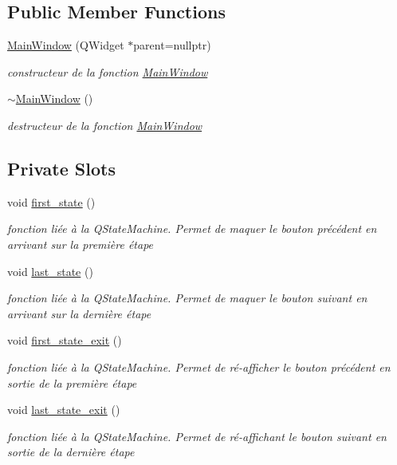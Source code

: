 \subsection*{Public Member Functions}
\begin{DoxyCompactItemize}
\item 
\hyperlink{classMainWindow_a996c5a2b6f77944776856f08ec30858d}{Main\+Window} (Q\+Widget $\ast$parent=nullptr)
\begin{DoxyCompactList}\small\item\em constructeur de la fonction \hyperlink{classMainWindow}{Main\+Window} \end{DoxyCompactList}\item 
\hyperlink{classMainWindow_ae98d00a93bc118200eeef9f9bba1dba7}{$\sim$\+Main\+Window} ()
\begin{DoxyCompactList}\small\item\em destructeur de la fonction \hyperlink{classMainWindow}{Main\+Window} \end{DoxyCompactList}\end{DoxyCompactItemize}
\subsection*{Private Slots}
\begin{DoxyCompactItemize}
\item 
void \hyperlink{classMainWindow_a408dd139f2400ee1fb7bd0e4545b2107}{first\+\_\+state} ()
\begin{DoxyCompactList}\small\item\em fonction liée à la Q\+State\+Machine. Permet de maquer le bouton précédent en arrivant sur la première étape \end{DoxyCompactList}\item 
void \hyperlink{classMainWindow_af3f49b394ed51e824ae8fc81d1ef252e}{last\+\_\+state} ()
\begin{DoxyCompactList}\small\item\em fonction liée à la Q\+State\+Machine. Permet de maquer le bouton suivant en arrivant sur la dernière étape \end{DoxyCompactList}\item 
void \hyperlink{classMainWindow_af15be8ac4337837cb0ceed0b9c490e0a}{first\+\_\+state\+\_\+exit} ()
\begin{DoxyCompactList}\small\item\em fonction liée à la Q\+State\+Machine. Permet de ré-\/afficher le bouton précédent en sortie de la première étape \end{DoxyCompactList}\item 
void \hyperlink{classMainWindow_a519a0a9fd60eea17c887433feab17ce0}{last\+\_\+state\+\_\+exit} ()
\begin{DoxyCompactList}\small\item\em fonction liée à la Q\+State\+Machine. Permet de ré-\/affichant le bouton suivant en sortie de la dernière étape \end{DoxyCompactList}\end{DoxyCompactItemize}
